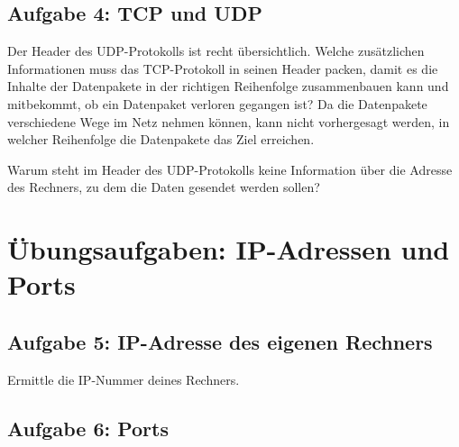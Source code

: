 \subsection{Aufgabe 4: TCP und UDP}

\begin{compactenum}[a)]
\item Der Header des UDP-Protokolls ist recht übersichtlich. Welche zusätzlichen
Informationen muss das TCP-Protokoll in seinen Header packen, damit es die
Inhalte der Datenpakete in der richtigen Reihenfolge zusammenbauen kann und
mitbekommt, ob ein Datenpaket verloren gegangen ist? Da die Datenpakete
verschiedene Wege im Netz nehmen können, kann nicht vorhergesagt werden, in
welcher Reihenfolge die Datenpakete das Ziel erreichen.

\item Warum steht im Header des UDP-Protokolls keine Information über die
Adresse des Rechners, zu dem die Daten gesendet werden sollen?
\end{compactenum}


\section{Übungsaufgaben: IP-Adressen und Ports}


\subsection{Aufgabe 5: IP-Adresse des eigenen Rechners}

Ermittle die IP-Nummer deines Rechners. 


\subsection{Aufgabe 6: Ports}

